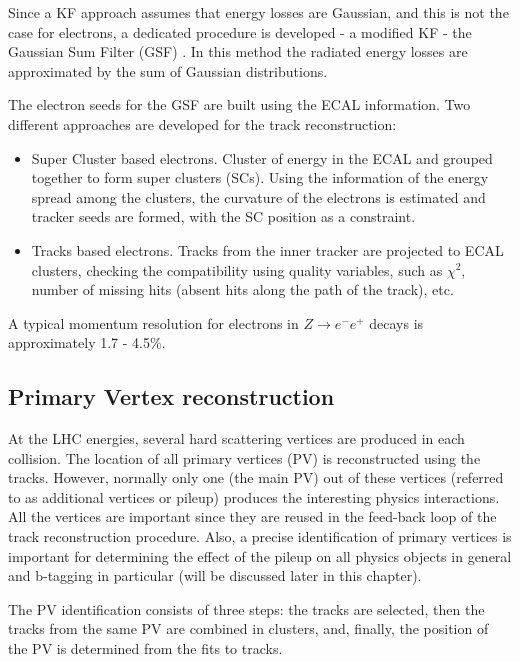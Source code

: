 \begin{small}
Since a KF approach assumes that energy losses are Gaussian, and this is not the case for electrons, a dedicated procedure is developed - a modified KF - the Gaussian Sum Filter (GSF) \cite{GSF}. In this method the radiated energy losses are approximated by the sum of Gaussian distributions. 

The electron seeds for the GSF are built using the ECAL information. Two different approaches are developed for the track reconstruction:

\begin{itemize}

\item Super Cluster based electrons. Cluster of energy in the ECAL and grouped together to form super clusters (SCs). Using the information of the energy spread among the clusters, the curvature of the electrons is estimated and tracker seeds are formed, with the SC position as a constraint. 
\item Tracks based electrons. Tracks from the inner tracker are projected to ECAL clusters, checking the compatibility using quality variables, such as $\chi^2$, number of missing hits (absent hits along the path of the track), etc. 
\end{itemize}

A typical momentum resolution for electrons in $Z \rightarrow e^- e^+$ decays is approximately 1.7 - 4.5$\%$.

\subsection{Primary Vertex reconstruction}\label{sec:PV_reconstruction}

At the LHC energies, several hard scattering vertices are produced in each collision. The location of all primary vertices (PV) is reconstructed using the tracks. However, normally only one (the main PV) out of these vertices (referred to as additional vertices or pileup) produces the interesting physics interactions. All the vertices are important since they are reused in the feed-back loop of the track reconstruction procedure. Also, a precise identification of primary vertices is important for determining the effect of the pileup on all physics objects in general and b-tagging in particular (will be discussed later in this chapter). 



The PV identification consists of three steps: the tracks are selected, then the tracks from the same PV are combined in clusters, and, finally, the position of the PV is determined from the fits to tracks.


\end{small}

